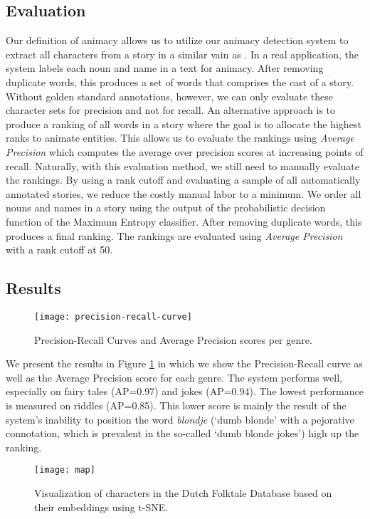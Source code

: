 \documentclass[a4paper,UKenglish]{oasics}
\begin{document}
\subsection{Evaluation}
Our definition of animacy allows us to utilize our animacy detection
system to extract all characters from a story in a similar vain as
\cite{karsdorp:12}. In a real application, the system labels each noun
and name in a text for animacy. After removing duplicate words, this
produces a set of words that comprises the cast of a story. Without
golden standard annotations, however, we can only evaluate these
character sets for precision and not for recall. An alternative
approach is to produce a ranking of all words in a story where the
goal is to allocate the highest ranks to animate entities. This allows
us to evaluate the rankings using \emph{Average Precision} which
computes the average over precision scores at increasing points of
recall. Naturally, with this evaluation method, we still need to
manually evaluate the rankings. By using a rank cutoff and evaluating
a sample of all automatically annotated stories, we reduce the costly
manual labor to a minimum. We order all nouns and names in a story
using the output of the probabilistic decision function of the Maximum
Entropy classifier. After removing duplicate words, this produces a
final ranking. The rankings are evaluated using \emph{Average
  Precision} with a rank cutoff at 50.

\subsection{Results}

\begin{figure}
\centering
\texttt{[image: precision-recall-curve]}
\caption{Precision-Recall Curves and Average Precision scores per
genre.}
\label{fig:prec-recall-curve}
\end{figure}

We present the results in Figure \ref{fig:prec-recall-curve} in which
we show the Precision-Recall curve as well as the Average Precision
score for each genre. The system performs well, especially on fairy
tales (AP=0.97) and jokes (AP=0.94). The lowest performance is
measured on riddles (AP=0.85). This lower score is mainly the result
of the system's inability to position the word \emph{blondje}
(`dumb blonde' with a pejorative connotation, which is prevalent in the so-called `dumb blonde jokes') high up the ranking. 

\begin{sidewaysfigure}
\texttt{[image: map]}
\caption{Visualization of characters in the Dutch Folktale Database based on their embeddings using t-SNE.}
\label{fig:map}
\end{sidewaysfigure}
\end{document}
